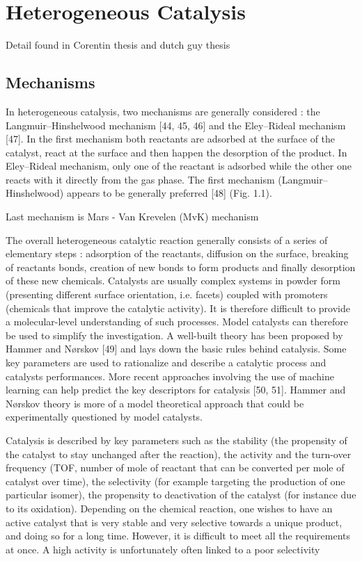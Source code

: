 \section{Heterogeneous Catalysis}\label{sec:Catalysis}

Detail found in Corentin thesis and dutch guy thesis

\subsection{Mechanisms}

In heterogeneous catalysis, two mechanisms are generally considered : the Langmuir–Hinshelwood mechanism [44, 45, 46] and the Eley–Rideal mechanism [47]. In the first mechanism both reactants are adsorbed at the surface of the catalyst, react at the surface and then happen the desorption of the product. In Eley–Rideal mechanism, only one of the reactant is adsorbed while the other one reacts with it directly from the gas phase. The first mechanism (Langmuir–Hinshelwood) appears to be generally preferred [48] (Fig. 1.1).

Last mechanism is Mars - Van Krevelen (MvK) mechanism

The overall heterogeneous catalytic reaction generally consists of a series of elementary
steps : adsorption of the reactants, diffusion on the surface, breaking of reactants bonds, creation of new bonds to form products and finally desorption of these new chemicals. Catalysts are usually complex systems in powder form (presenting different surface orientation, i.e. facets) coupled with promoters (chemicals that improve the catalytic activity). It is therefore difficult to provide a molecular-level understanding of such processes. Model catalysts can therefore be used to simplify the investigation. A well-built theory has been proposed by Hammer and Nørskov [49] and lays down the basic rules behind catalysis. Some key parameters are used to rationalize and describe a catalytic process and catalysts performances. More recent approaches involving the use of machine learning can help predict the key descriptors for catalysis [50, 51]. Hammer and Nørskov theory is more of a model theoretical approach that could be experimentally questioned by model catalysts.

Catalysis is described by key parameters such as the stability (the propensity of the catalyst to stay unchanged after the reaction), the activity and the turn-over frequency (TOF, number of mole of reactant that can be converted per mole of catalyst over time), the selectivity (for example targeting the production of one particular isomer), the propensity to deactivation of the catalyst (for instance due to its oxidation). Depending on the chemical reaction, one wishes to have an active catalyst that is very stable and very selective towards a unique product, and doing so for a long time. However, it is difficult to meet all the requirements at once. A high activity is unfortunately often linked to a poor selectivity

